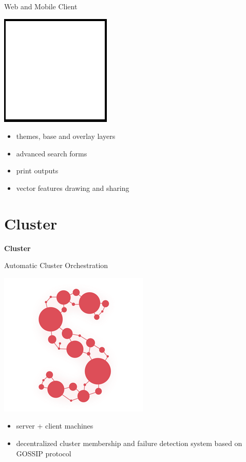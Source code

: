 \documentclass[12pt]{beamer}
\begin{document}
\begin{frame}{Web and Mobile Client}
	\begin{center}
		\includegraphics[keepaspectratio=true,height=0.5\textheight]{images/image.png}
	\end{center}
	\begin{itemize}
		\item themes, base and overlay layers
		\item advanced search forms
		\item print outputs
		\item vector features drawing and sharing
	\end{itemize}
\end{frame}


\section{Cluster}
\begin{frame}
	\begin{center}
		\LARGE\textbf{Cluster}	
	\end{center}
\end{frame}

\begin{frame}{Automatic Cluster Orchestration}
	\begin{center}
		\includegraphics[keepaspectratio=true,height=0.5\textheight]{images/serf.png}
	\end{center}
	\begin{itemize}
		\item server + client machines
		\item decentralized cluster membership and failure detection system based on GOSSIP protocol
	\end{itemize}
\end{frame}
\end{document}
